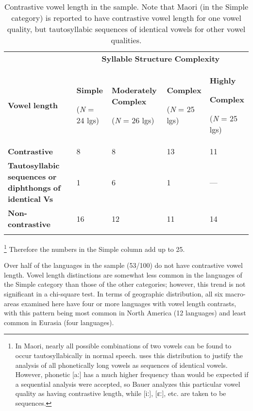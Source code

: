 \begin{table}
\begin{tabularx}{\textwidth}{XXXXX}
 & \multicolumn{4}{c}{ \textbf{Syllable} \textbf{Structure} \textbf{Complexity}}\\
\lsptoprule
\textbf{Vowel} \textbf{length} & { \textbf{Simple}}

 (\textit{N} = 24 lgs) & { \textbf{Moderately} \textbf{Complex}}

 (\textit{N} = 26 lgs) & { \textbf{Complex}}

 (\textit{N} = 25 lgs) & { \textbf{Highly} }

{ \textbf{Complex}}

 (\textit{N} = 25 lgs)\\
\textbf{Contrastive} & 8 & 8 & 13 & 11\\
\textbf{Tautosyllabic} \textbf{sequences} \textbf{or} \textbf{diphthongs} \textbf{of} \textbf{identical} \textbf{Vs} & 1 & 6 & 1 & —\\
\textbf{Non-contrastive} & 16 & 12 & 11 & 14\\
\lspbottomrule
\end{tabularx}
\caption{\label{4.3}Contrastive vowel length in the sample. Note that Maori (in the Simple category) is reported to have contrastive vowel length for one vowel quality, but tautosyllabic sequences of identical vowels for other vowel qualities.}
\footnote{ \textrm{In Maori, nearly all possible combinations of two vowels can be found to occur tautosyllabically in normal speech. \citet[524-8]{Bauer1999} uses this distribution to justify the analysis of all phonetically long vowels as sequences of identical vowels. However, phonetic [aː] has a much higher frequency than would be expected if a sequential analysis were accepted, so Bauer analyzes this particular vowel quality as having contrastive length, while [iː], [ɛː], etc. are taken to be sequences.}}
Therefore the numbers in the Simple column add up to 25.
\end{table}




  Over half of the languages in the sample (53/100) do not have contrastive vowel length. Vowel length distinctions are somewhat less common in the languages of the Simple category than those of the other categories; however, this trend is not significant in a chi-square test. In terms of geographic distribution, all six macro-areas examined here have four or more languages with vowel length contrasts, with this pattern being most common in North America (12 languages) and least common in Eurasia (four languages).



